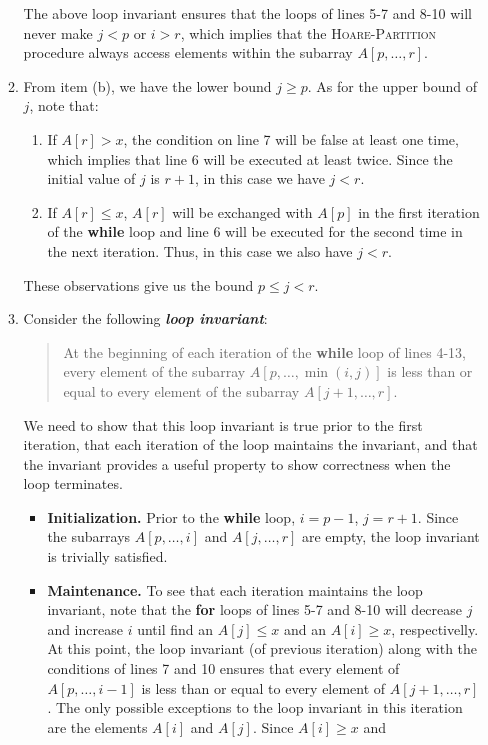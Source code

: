 \documentclass{report}
\makeatletter
\renewenvironment{framed}{%
 \def\FrameCommand##1{\hskip\@totalleftmargin
 \fboxsep=\FrameSep\fbox{##1}}%
 \MakeFramed {\advance\hsize-\width
   \@totalleftmargin\z@ \linewidth\hsize
   \@setminipage}}%
 {\par\unskip\endMakeFramed}
\makeatother
\begin{document}
\begin{enumerate}
\begin{framed}
\begin{enumerate}
{The above loop invariant ensures that the  loops of lines 5-7 and
8-10 will never make $j < p$ or $i > r$, which implies that the
\textsc{Hoare-Partition} procedure always access elements within the subarray
$A[p, \dots, r]$.
}
\item{From item (b), we have the lower bound $j \ge p$. As for the upper bound
of $j$, note that:
\begin{enumerate}
  \item If $A[r] > x$, the condition on line 7 will be false at least one time,
    which implies that line 6 will be executed at least twice. Since the initial
    value of $j$ is $r + 1$, in this case we have $j < r$.
  \item If $A[r] \le x$, $A[r]$ will be exchanged with $A[p]$ in the first
    iteration of the \textbf{while} loop and line 6 will be executed for the
    second time in the next iteration. Thus, in this case we also have $j < r$.
\end{enumerate}
These observations give us the bound $p \le j < r$.
}
\item{Consider the following \textbf{\emph{loop invariant}}:
\begin{quote}
At the beginning of each iteration of the \textbf{while} loop of lines 4-13,
every element of the subarray $A[p, \dots, \min(i, j)]$ is less than or equal
to every element of the subarray $A[j + 1, \dots, r]$.
\end{quote}
We need to show that this loop invariant is true prior to the first iteration,
that each iteration of the loop maintains the invariant, and that the invariant
provides a useful property to show correctness when the loop terminates.
\begin{itemize}
\item \textbf{Initialization.} Prior to the \textbf{while} loop, $i = p - 1$,
$j = r + 1$. Since the subarrays $A[p, \dots, i]$ and $A[j, \dots, r]$ are
empty, the loop invariant is trivially satisfied.
\item \textbf{Maintenance.} To see that each iteration maintains the loop
invariant, note that the \textbf{for} loops of lines 5-7 and 8-10 will decrease
$j$ and increase $i$ until find an $A[j] \le x$ and an $A[i] \ge x$,
respectivelly. At this point, the loop invariant (of previous iteration)
along with the conditions of lines 7 and 10 ensures that every element of
$A[p, \dots, i - 1]$ is less than or equal to every element of
$A[j + 1, \dots, r]$. The only possible exceptions to the loop invariant in this
iteration are the elements $A[i]$ and $A[j]$. Since $A[i] \ge x$ and

\end{itemize}}
\end{enumerate}
\end{framed}
\end{enumerate}
\end{document}
